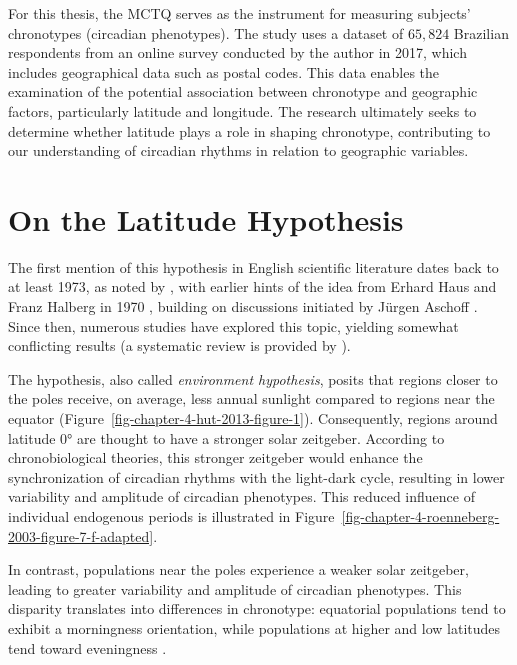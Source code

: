 \documentclass[
12pt,
openright,
oneside,
a4paper,
chapter=TITLE,
section=TITLE,
french,
spanish,
brazil,
english
]{abntex2}
\begin{document}
For this thesis, the MCTQ serves as the instrument for measuring
subjects' chronotypes (circadian phenotypes). The study uses a dataset
of \(65,824\) Brazilian respondents from an online survey conducted by
the author in 2017, which includes geographical data such as postal
codes. This data enables the examination of the potential association
between chronotype and geographic factors, particularly latitude and
longitude. The research ultimately seeks to determine whether latitude
plays a role in shaping chronotype, contributing to our understanding of
circadian rhythms in relation to geographic variables.


\chapter{On the Latitude
Hypothesis}\label{sec-on-the-latitude-hypothesis}

The first mention of this hypothesis in English scientific literature
dates back to at least 1973, as noted by \textcite{bohlen1973}, with
earlier hints of the idea from Erhard Haus and Franz Halberg in 1970
\autocite[101]{haus1970}, building on discussions initiated by Jürgen
Aschoff \autocite{aschoff1969}. Since then, numerous studies have
explored this topic, yielding somewhat conflicting results (a systematic
review is provided by \textcite{randler2017}).

The hypothesis, also called \emph{environment hypothesis}, posits that
regions closer to the poles receive, on average, less annual sunlight
compared to regions near the equator
(Figure~\ref{fig-chapter-4-hut-2013-figure-1}). Consequently, regions
around latitude 0° are thought to have a stronger solar zeitgeber.
According to chronobiological theories, this stronger zeitgeber would
enhance the synchronization of circadian rhythms with the light-dark
cycle, resulting in lower variability and amplitude of circadian
phenotypes. This reduced influence of individual endogenous periods is
illustrated in
Figure~\ref{fig-chapter-4-roenneberg-2003-figure-7-f-adapted}.

In contrast, populations near the poles experience a weaker solar
zeitgeber, leading to greater variability and amplitude of circadian
phenotypes. This disparity translates into differences in chronotype:
equatorial populations tend to exhibit a morningness orientation, while
populations at higher and low latitudes tend toward eveningness
\autocite{bohlen1973,roenneberg2003}.
\end{document}
